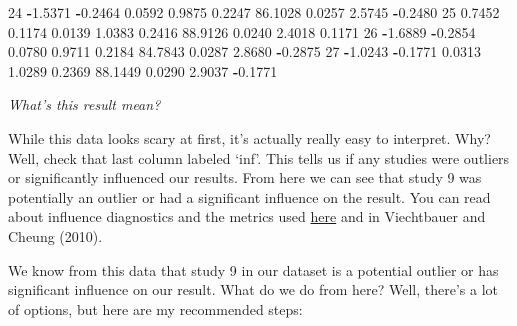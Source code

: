 \documentclass[
]{book}
\newenvironment{Shaded}{\begin{snugshade}}{\end{snugshade}}
\newcommand{\DecValTok}[1]{\textcolor[rgb]{0.00,0.00,0.81}{#1}}
\newcommand{\FloatTok}[1]{\textcolor[rgb]{0.00,0.00,0.81}{#1}}
\newcommand{\SpecialCharTok}[1]{\textcolor[rgb]{0.81,0.36,0.00}{\textbf{#1}}}
\begin{document}
\begin{Shaded}
\begin{Highlighting}[]
\DecValTok{24}  \SpecialCharTok{{-}}\FloatTok{1.5371} \SpecialCharTok{{-}}\FloatTok{0.2464} \FloatTok{0.0592} \FloatTok{0.9875}   \FloatTok{0.2247} \FloatTok{86.1028} \FloatTok{0.0257} \FloatTok{2.5745} \SpecialCharTok{{-}}\FloatTok{0.2480}     
\DecValTok{25}   \FloatTok{0.7452}  \FloatTok{0.1174} \FloatTok{0.0139} \FloatTok{1.0383}   \FloatTok{0.2416} \FloatTok{88.9126} \FloatTok{0.0240} \FloatTok{2.4018}  \FloatTok{0.1171}     
\DecValTok{26}  \SpecialCharTok{{-}}\FloatTok{1.6889} \SpecialCharTok{{-}}\FloatTok{0.2854} \FloatTok{0.0780} \FloatTok{0.9711}   \FloatTok{0.2184} \FloatTok{84.7843} \FloatTok{0.0287} \FloatTok{2.8680} \SpecialCharTok{{-}}\FloatTok{0.2875}     
\DecValTok{27}  \SpecialCharTok{{-}}\FloatTok{1.0243} \SpecialCharTok{{-}}\FloatTok{0.1771} \FloatTok{0.0313} \FloatTok{1.0289}   \FloatTok{0.2369} \FloatTok{88.1449} \FloatTok{0.0290} \FloatTok{2.9037} \SpecialCharTok{{-}}\FloatTok{0.1771}
\end{Highlighting}
\end{Shaded}

\emph{What's this result mean?}

While this data looks scary at first, it's actually really easy to interpret. Why? Well, check that last column labeled `inf'. This tells us if any studies were outliers or significantly influenced our results. From here we can see that study 9 was potentially an outlier or had a significant influence on the result. You can read about influence diagnostics and the metrics used \href{https://wviechtb.github.io/metafor/reference/influence.rma.uni.html}{here} and in Viechtbauer and Cheung (2010)\citep{viechtbauer2010b}.

We know from this data that study 9 in our dataset is a potential outlier or has significant influence on our result. What do we do from here? Well, there's a lot of options, but here are my recommended steps:
\end{document}
